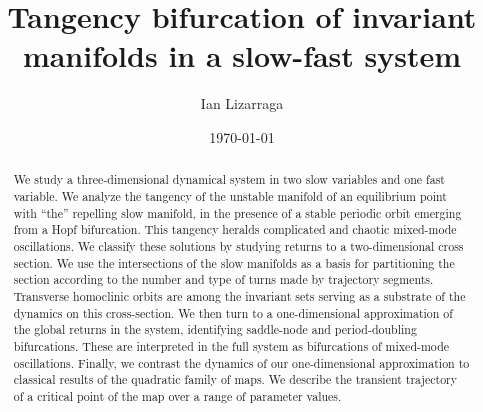 \documentclass[aip, cha, sd, amsmath,amssymb, preprint]{revtex4-1}
\begin{document}

\title[]{Tangency bifurcation of invariant manifolds in a slow-fast system}

\author{Ian Lizarraga}

\date{\today}

\begin{abstract}
We study a three-dimensional dynamical system in two slow variables and one fast variable. We analyze the tangency of the unstable manifold of an equilibrium point with ``the'' repelling slow manifold, in the presence of a stable periodic orbit emerging from a Hopf bifurcation. This tangency heralds complicated and chaotic mixed-mode oscillations. We classify these solutions by studying returns to a two-dimensional cross section. We use the intersections of the slow manifolds as a basis for partitioning the section according to the number and type of turns made by trajectory segments. Transverse homoclinic orbits are among the invariant sets serving as a substrate of the dynamics on this cross-section. We then turn to a one-dimensional approximation of the global returns in the system, identifying saddle-node and period-doubling bifurcations. These are interpreted in the full system as bifurcations of mixed-mode oscillations. Finally, we contrast the dynamics of our one-dimensional approximation to classical results of the quadratic family of maps. We describe the transient trajectory of a critical point of the map over a range of parameter values.
\end{abstract}

\maketitle
\end{document}
